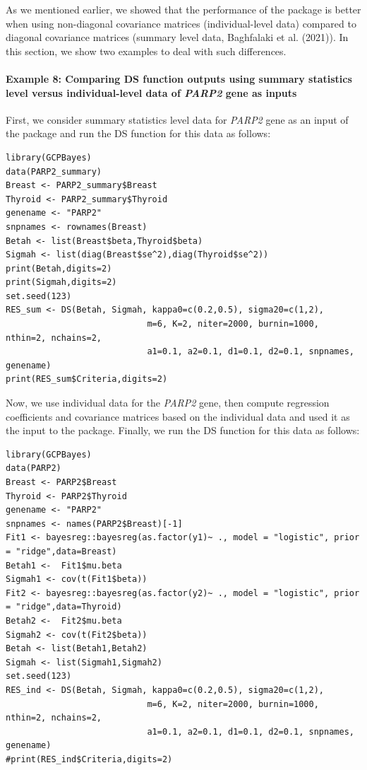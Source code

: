 As we mentioned earlier, we showed that the performance of the  package is better when using non-diagonal
covariance matrices (individual-level data) compared to diagonal covariance matrices (summary level data, Baghfalaki et al. (2021)). In this section, we show two examples to deal with such differences.

\hypertarget{example-8-comparing-ds-function-outputs-using-summary-statistics-level-versus-individual-level-data-of-parp2-gene-as-inputs}{%
\paragraph{\texorpdfstring{Example 8: Comparing DS function outputs using summary statistics level versus individual-level data of \emph{PARP2} gene as inputs}{Example 8: Comparing DS function outputs using summary statistics level versus individual-level data of PARP2 gene as inputs}}\label{example-8-comparing-ds-function-outputs-using-summary-statistics-level-versus-individual-level-data-of-parp2-gene-as-inputs}}

First, we consider summary statistics level data for \emph{PARP2} gene as an input of the  package and run the DS function for this data as follows:

\begin{verbatim}
library(GCPBayes)
data(PARP2_summary)
Breast <- PARP2_summary$Breast
Thyroid <- PARP2_summary$Thyroid
genename <- "PARP2"
snpnames <- rownames(Breast)
Betah <- list(Breast$beta,Thyroid$beta)
Sigmah <- list(diag(Breast$se^2),diag(Thyroid$se^2))
print(Betah,digits=2)
print(Sigmah,digits=2)
set.seed(123)
RES_sum <- DS(Betah, Sigmah, kappa0=c(0.2,0.5), sigma20=c(1,2),
                            m=6, K=2, niter=2000, burnin=1000, nthin=2, nchains=2,
                            a1=0.1, a2=0.1, d1=0.1, d2=0.1, snpnames, genename)
print(RES_sum$Criteria,digits=2)
\end{verbatim}

Now, we use individual data for the \emph{PARP2} gene,
then compute regression coefficients and covariance matrices based on the individual data and used it as the input to the  package. Finally, we run the DS function for this data as follows:

\begin{verbatim}
library(GCPBayes)
data(PARP2)
Breast <- PARP2$Breast
Thyroid <- PARP2$Thyroid
genename <- "PARP2"
snpnames <- names(PARP2$Breast)[-1]
Fit1 <- bayesreg::bayesreg(as.factor(y1)~ ., model = "logistic", prior = "ridge",data=Breast)
Betah1 <-  Fit1$mu.beta
Sigmah1 <- cov(t(Fit1$beta))
Fit2 <- bayesreg::bayesreg(as.factor(y2)~ ., model = "logistic", prior = "ridge",data=Thyroid)
Betah2 <-  Fit2$mu.beta
Sigmah2 <- cov(t(Fit2$beta))
Betah <- list(Betah1,Betah2)
Sigmah <- list(Sigmah1,Sigmah2)
set.seed(123)
RES_ind <- DS(Betah, Sigmah, kappa0=c(0.2,0.5), sigma20=c(1,2),
                            m=6, K=2, niter=2000, burnin=1000, nthin=2, nchains=2,
                            a1=0.1, a2=0.1, d1=0.1, d2=0.1, snpnames, genename)
#print(RES_ind$Criteria,digits=2)
\end{verbatim}


